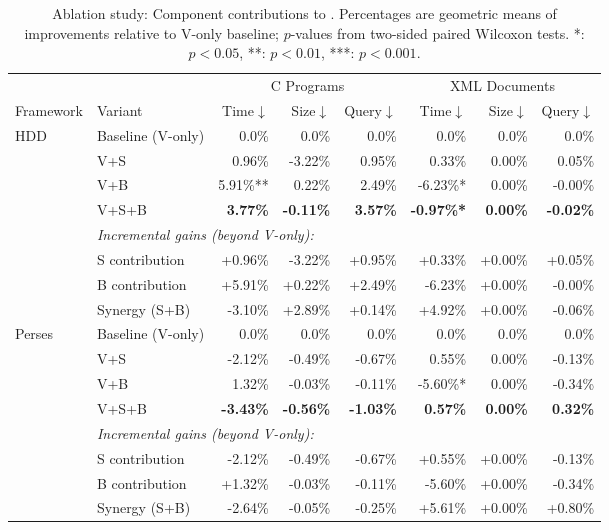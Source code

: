 \begin{table}[t]
\caption{Ablation study: Component contributions to \SAddmin. 
Percentages are geometric means of improvements relative to V-only baseline; 
$p$-values from two-sided paired Wilcoxon tests. 
*: $p<0.05$, **: $p<0.01$, ***: $p<0.001$.}
\label{tab:ablation}
\centering
\footnotesize
\begin{tabular}{ll|rrr|rrr}
\toprule
& & \multicolumn{3}{c|}{C Programs} & \multicolumn{3}{c}{XML Documents} \\
Framework & Variant & Time$\downarrow$ & Size$\downarrow$ & Query$\downarrow$ & Time$\downarrow$ & Size$\downarrow$ & Query$\downarrow$ \\
\midrule
\multirow{8}{*}{HDD} & Baseline (V-only) & 0.0\% & 0.0\% & 0.0\% & 0.0\% & 0.0\% & 0.0\% \\
 & V+S & 0.96\% & -3.22\% & 0.95\% & 0.33\% & 0.00\% & 0.05\% \\
 & V+B & 5.91\%** & 0.22\% & 2.49\% & -6.23\%* & 0.00\% & -0.00\% \\
 & V+S+B & \textbf{3.77\%} & \textbf{-0.11\%} & \textbf{3.57\%} & \textbf{-0.97\%*} & \textbf{0.00\%} & \textbf{-0.02\%} \\
\cmidrule(lr){2-8}
& \multicolumn{7}{l}{\textit{Incremental gains (beyond V-only):}}\\
 & S contribution & +0.96\% & -3.22\% & +0.95\% & +0.33\% & +0.00\% & +0.05\% \\
 & B contribution & +5.91\% & +0.22\% & +2.49\% & -6.23\% & +0.00\% & -0.00\% \\
 & Synergy (S+B) & -3.10\% & +2.89\% & +0.14\% & +4.92\% & +0.00\% & -0.06\% \\
\midrule
\multirow{8}{*}{Perses} & Baseline (V-only) & 0.0\% & 0.0\% & 0.0\% & 0.0\% & 0.0\% & 0.0\% \\
 & V+S & -2.12\% & -0.49\% & -0.67\% & 0.55\% & 0.00\% & -0.13\% \\
 & V+B & 1.32\% & -0.03\% & -0.11\% & -5.60\%* & 0.00\% & -0.34\% \\
 & V+S+B & \textbf{-3.43\%} & \textbf{-0.56\%} & \textbf{-1.03\%} & \textbf{0.57\%} & \textbf{0.00\%} & \textbf{0.32\%} \\
\cmidrule(lr){2-8}
& \multicolumn{7}{l}{\textit{Incremental gains (beyond V-only):}}\\
 & S contribution & -2.12\% & -0.49\% & -0.67\% & +0.55\% & +0.00\% & -0.13\% \\
 & B contribution & +1.32\% & -0.03\% & -0.11\% & -5.60\% & +0.00\% & -0.34\% \\
 & Synergy (S+B) & -2.64\% & -0.05\% & -0.25\% & +5.61\% & +0.00\% & +0.80\% \\
\bottomrule
\end{tabular}
\end{table}
